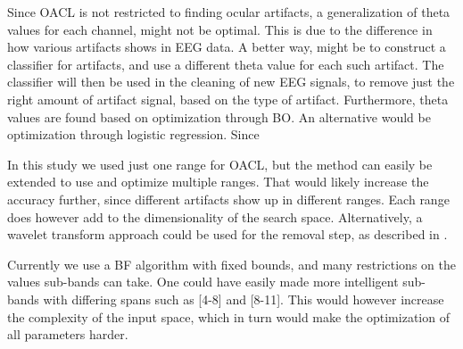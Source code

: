 Since OACL is not restricted to finding ocular artifacts, a generalization of theta values for each channel, might not be optimal. This is due to the difference in how various artifacts shows in EEG data. A better way, might be to construct a classifier for artifacts, and use a different theta value for each such artifact. The classifier will then be used in the cleaning of new EEG signals, to remove just the right amount of artifact signal, based on the type of artifact. Furthermore, theta values are found based on optimization through BO. An alternative would be optimization through logistic regression. Since  

In this study we used just one range for OACL, but the method can easily be extended to use and optimize multiple ranges. That would likely increase the accuracy further, since different artifacts show up in different ranges. Each range does however add to the dimensionality of the search space. Alternatively, a wavelet transform approach could be used for the removal step, as described in \citep{krishnaveni2006automatic}.

Currently we use a BF algorithm with fixed bounds, and many restrictions on the values sub-bands can take. One could have easily made more intelligent sub-bands with differing spans such as [4-8] and [8-11]. This would however increase the complexity of the input space, which in turn would make the optimization of all parameters harder. 
